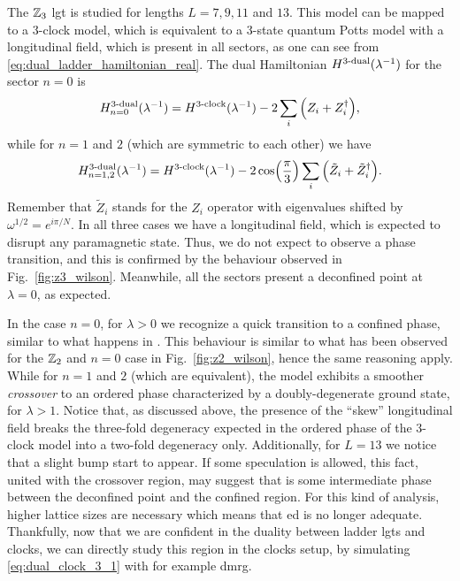 The $\Z_3$ \ac{lgt} is studied for lengths $L=7,9,11$ and $13$.
This model can be mapped to a $3$-clock model, which is equivalent to a $3$-state quantum Potts model with a longitudinal field, which is present in all sectors, as one can see from \eqref{eq:dual_ladder_hamiltonian_real}.
The dual Hamiltonian $\HamilDual[3](\lambda^{-1})$ for the sector $n=0$ is
\begin{equation}
    \HamilDual[3]_{n=0}(\lambda^{-1}) = \HamilClock[3](\lambda^{-1}) - 2 \sum_{i} \qty(Z_i + Z_i^{\dagger}),
\end{equation}
while for $n=1$ and $2$ (which are symmetric to each other) we have
\begin{equation}
    \HamilDual[3]_{n=1,2}(\lambda^{-1}) = \HamilClock[3](\lambda^{-1}) - 2 \cos( \frac{\pi}{3} ) \sum_{i} \qty(\tilde{Z}_i + \tilde{Z}_i^{\dagger}).
    \label{eq:dual_clock_3_1}
\end{equation}
Remember that $\tilde{Z}_i$ stands for the $Z_i$ operator with eigenvalues shifted by $\omega^{1/2} = e^{i \pi /N}$.
In all three cases we have a longitudinal field, which is expected to disrupt any paramagnetic state.
Thus, we do not expect to observe a phase transition, and this is confirmed by the behaviour observed in Fig.~\ref{fig:z3_wilson}.
Meanwhile, all the sectors present a deconfined point at $\lambda = 0$, as expected.

In the case $n=0$, for $\lambda > 0$ we recognize a quick transition to a confined phase, similar to what happens in \cite{burrello2021ladder}.
This behaviour is similar to what has been observed for the $\Z_2$ and $n=0$ case in Fig.~\ref{fig:z2_wilson}, hence the same reasoning apply.
While for $n=1$ and $2$ (which are equivalent), the model exhibits a smoother \emph{crossover} to an ordered phase characterized by a doubly-degenerate ground state, for $\lambda > 1$.
Notice that, as discussed above,  the presence of the ``skew'' longitudinal field breaks the three-fold degeneracy expected in the ordered phase of the $3$-clock model into a two-fold degeneracy only.
Additionally, for $L=13$ we notice that a slight bump start to appear.
If some speculation is allowed, this fact, united with the crossover region, may suggest that is some intermediate phase between the deconfined point and the confined region.
For this kind of analysis, higher lattice sizes are necessary which means that \ac{ed} is no longer adequate.
Thankfully, now that we are confident in the duality between ladder \acp{lgt} and \acp{clock}, we can directly study this region in the \acp{clock} setup, by simulating \eqref{eq:dual_clock_3_1} with for example \ac{dmrg}.


